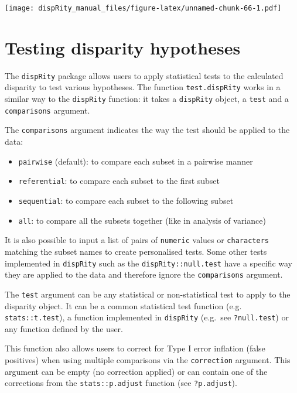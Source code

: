 \documentclass[]{book}
\providecommand{\tightlist}{%
  \setlength{\itemsep}{0pt}\setlength{\parskip}{0pt}}
\begin{document}
\texttt{[image: dispRity\_manual\_files/figure-latex/unnamed-chunk-66-1.pdf]}

\hypertarget{testing-disparity-hypotheses}{%
\section{Testing disparity hypotheses}\label{testing-disparity-hypotheses}}

The \texttt{dispRity} package allows users to apply statistical tests to the calculated disparity to test various hypotheses.
The function \texttt{test.dispRity} works in a similar way to the \texttt{dispRity} function: it takes a \texttt{dispRity} object, a \texttt{test} and a \texttt{comparisons} argument.

The \texttt{comparisons} argument indicates the way the test should be applied to the data:

\begin{itemize}
\tightlist
\item
  \texttt{pairwise} (default): to compare each subset in a pairwise manner
\item
  \texttt{referential}: to compare each subset to the first subset
\item
  \texttt{sequential}: to compare each subset to the following subset
\item
  \texttt{all}: to compare all the subsets together (like in analysis of variance)
\end{itemize}

It is also possible to input a list of pairs of \texttt{numeric} values or \texttt{characters} matching the subset names to create personalised tests.
Some other tests implemented in \texttt{dispRity} such as the \texttt{dispRity::null.test} have a specific way they are applied to the data and therefore ignore the \texttt{comparisons} argument.

The \texttt{test} argument can be any statistical or non-statistical test to apply to the disparity object.
It can be a common statistical test function (e.g. \texttt{stats::t.test}), a function implemented in \texttt{dispRity} (e.g.~see \texttt{?null.test}) or any function defined by the user.

This function also allows users to correct for Type I error inflation (false positives) when using multiple comparisons via the \texttt{correction} argument.
This argument can be empty (no correction applied) or can contain one of the corrections from the \texttt{stats::p.adjust} function (see \texttt{?p.adjust}).
\end{document}
